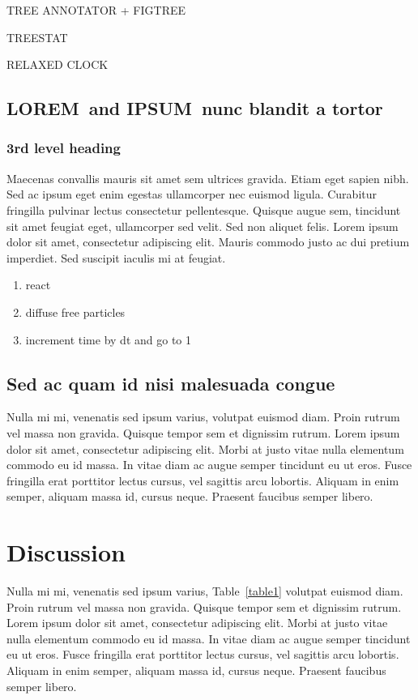 \documentclass[10pt,letterpaper]{article}
\newcommand{\lorem}{{\bf LOREM}}
\newcommand{\ipsum}{{\bf IPSUM}}
\begin{document}

TREE ANNOTATOR + FIGTREE

TREESTAT

RELAXED CLOCK

\subsection*{\lorem\ and \ipsum\ nunc blandit a tortor}
\subsubsection*{3rd level heading} 
Maecenas convallis mauris sit amet sem ultrices gravida. Etiam eget sapien nibh. Sed ac ipsum eget enim egestas ullamcorper nec euismod ligula. Curabitur fringilla pulvinar lectus consectetur pellentesque. Quisque augue sem, tincidunt sit amet feugiat eget, ullamcorper sed velit. Sed non aliquet felis. Lorem ipsum dolor sit amet, consectetur adipiscing elit. Mauris commodo justo ac dui pretium imperdiet. Sed suscipit iaculis mi at feugiat. 

\begin{enumerate}
	\item{react}
	\item{diffuse free particles}
	\item{increment time by dt and go to 1}
\end{enumerate}


\subsection*{Sed ac quam id nisi malesuada congue}

Nulla mi mi, venenatis sed ipsum varius, volutpat euismod diam. Proin rutrum vel massa non gravida. Quisque tempor sem et dignissim rutrum. Lorem ipsum dolor sit amet, consectetur adipiscing elit. Morbi at justo vitae nulla elementum commodo eu id massa. In vitae diam ac augue semper tincidunt eu ut eros. Fusce fringilla erat porttitor lectus cursus, vel sagittis arcu lobortis. Aliquam in enim semper, aliquam massa id, cursus neque. Praesent faucibus semper libero.



\section*{Discussion}
Nulla mi mi, venenatis sed ipsum varius, Table~\ref{table1} volutpat euismod diam. Proin rutrum vel massa non gravida. Quisque tempor sem et dignissim rutrum. Lorem ipsum dolor sit amet, consectetur adipiscing elit. Morbi at justo vitae nulla elementum commodo eu id massa. In vitae diam ac augue semper tincidunt eu ut eros. Fusce fringilla erat porttitor lectus cursus, vel sagittis arcu lobortis. Aliquam in enim semper, aliquam massa id, cursus neque. Praesent faucibus semper libero.
\end{document}
